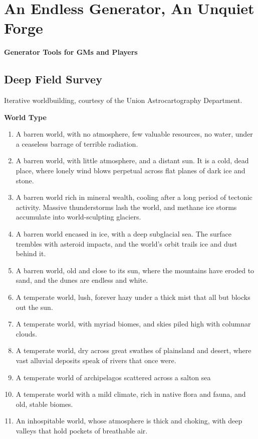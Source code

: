 \section{An Endless Generator, An Unquiet Forge}

\textbf{Generator Tools for GMs and Players}

\subsection{Deep Field Survey}

Iterative worldbuilding, courtesy of the Union Astrocartography Department.

\textbf{World Type}
\begin{enumerate}
    \item  A barren world, with no atmosphere, few valuable resources, no water, under a ceaseless barrage of terrible radiation.
    \item  A barren world, with little atmosphere, and a distant sun. It is a cold, dead place, where lonely wind blows perpetual across flat planes of dark ice and stone.
    \item  A barren world rich in mineral wealth, cooling after a long period of tectonic activity. Massive thunderstorms lash the world, and methane ice storms accumulate into world-sculpting glaciers.
    \item  A barren world encased in ice, with a deep subglacial sea. The surface trembles with asteroid impacts, and the world’s orbit trails ice and dust behind it.
    \item  A barren world, old and close to its sun, where the mountains have eroded to sand, and the dunes are endless and white.
    \item  A temperate world, lush, forever hazy under a thick mist that all but blocks out the sun.
    \item  A temperate world, with myriad biomes, and skies piled high with columnar clouds.
    \item  A temperate world, dry across great swathes of plainsland and desert, where vast alluvial deposits speak of rivers that once were.
    \item  A temperate world of archipelagos scattered across a salton sea
    \item  A temperate world with a mild climate, rich in native flora and fauna, and old, stable biomes.
    \item  An inhospitable world, whose atmosphere is thick and choking, with deep valleys that hold pockets of breathable air.

\end{enumerate}
